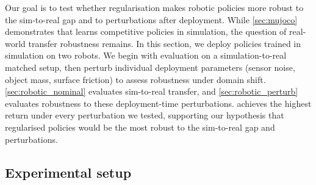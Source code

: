 
\vspace{-6pt}
Our goal is to test whether regularisation makes robotic policies more robust to the sim-to-real gap and to perturbations after deployment. While \autoref{sec:mujoco} demonstrates that \ourMethod learns competitive policies in simulation, the question of real-world transfer robustness remains. 
In this section, we deploy policies trained in simulation on two robots. 
We begin with evaluation on a simulation-to-real matched setup, then perturb individual deployment parameters (sensor noise, object mass, surface friction) to
 assess robustness under domain shift.
\autoref{sec:robotic_nominal} evaluates sim-to-real transfer, and \autoref{sec:robotic_perturb} evaluates robustness to these deployment-time perturbations.
\ourMethod achieves the highest return under every perturbation we tested, supporting our hypothesis that regularised policies would be the most robust to the sim-to-real gap and perturbations.

\subsection{Experimental setup}
\label{sec:robotic_setup}


